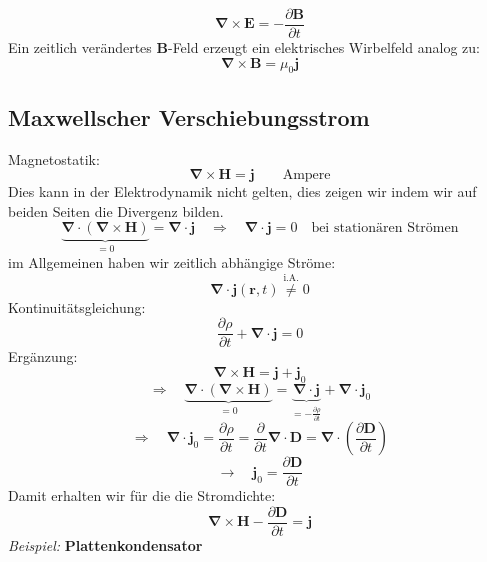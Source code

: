 \documentclass[titlepage,11pt,a4paper,ngerman]{report}
\newcommand{\tx}[1]{\textrm{#1}}
\newcommand{\ub}[1]{\underbrace{#1}}
\newcommand{\prt}[2]{\frac{\partial #1}{\partial #2}}
\renewcommand{\vec}[1]{\boldsymbol{#1}}
\newcommand{\vabla}{\boldsymbol{\nabla}}
\begin{document}
\begin{enumerate}[i)]
\begin{itemize}
		
	\end{itemize}
\end{enumerate}

\begin{equation*}
\vabla \times \vec{E} = - \prt{\vec{B}}{t}
\end{equation*}
Ein zeitlich verändertes $ \vec{B} $-Feld erzeugt ein elektrisches Wirbelfeld analog zu:
\begin{equation*}
\vabla \times \vec{B} = \mu_0 \vec{j}
\end{equation*}


\subsection{Maxwellscher Verschiebungsstrom}

Magnetostatik:
\begin{equation*}
\vabla \times \vec{H} = \vec{j} \qquad \tx{Ampere}
\end{equation*}
Dies kann in der Elektrodynamik nicht gelten, dies zeigen wir indem wir auf beiden Seiten die Divergenz bilden.
\begin{equation*}
\ub{\vabla \cdot (\vabla \times \vec{H})}_{=0} = \vabla \cdot \vec{j} \quad \Rightarrow \quad \vabla \cdot \vec{j} = 0 \quad \tx{bei stationären Strömen}
\end{equation*}
im Allgemeinen haben wir zeitlich abhängige Ströme:
\begin{equation*}
\vabla \cdot \vec{j}(\vec{r},t) \overset{\tx{i.A.}}{\neq} 0
\end{equation*}
Kontinuitätsgleichung:
\begin{equation*}
\prt{\rho}{t} + \vabla \cdot \vec{j} = 0
\end{equation*}
Ergänzung:
\begin{equation*}
\vabla \times \vec{H} = \vec{j} + \vec{j}_0
\end{equation*}
\begin{equation*}
\Rightarrow \quad \ub{\vabla \cdot (\vabla \times \vec{H})}_{= 0} = \ub{\vabla \cdot \vec{j}}_{= - \prt{\rho}{t}} + \vabla \cdot \vec{j}_0
\end{equation*}
\begin{equation*}
\Rightarrow \quad \vabla \cdot \vec{j}_0 = \prt{\rho}{t} = \prt{}{t} \vabla \cdot \vec{D} = \vabla \cdot \left(\prt{\vec{D}}{t}\right)
\end{equation*}
\begin{equation*}
\rightarrow \quad \vec{j}_0 = \prt{\vec{D}}{t}
\end{equation*}
Damit erhalten wir für die die Stromdichte:
\begin{equation*}
\vabla \times \vec{H} - \prt{\vec{D}}{t} = \vec{j}
\end{equation*}
\emph{Beispiel:} \textbf{Plattenkondensator}
\end{document}

